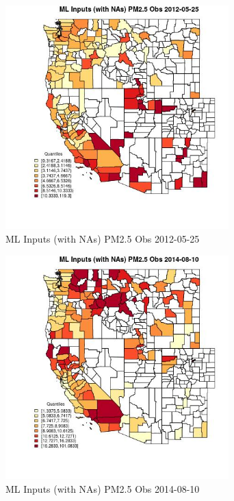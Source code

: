 
\clearpage 

\begin{figure} 
\centering  
\includegraphics[width=0.77\textwidth]{Code_Outputs/Report_ML_input_PM25_Step4_part_e_de_duplicated_aves_compiled_2019-05-18wNAs_CountyPM25_ObsMean2012-05-25_2012-05-25.jpg} 
\caption{\label{fig:Report_ML_input_PM25_Step4_part_e_de_duplicated_aves_compiled_2019-05-18wNAsCountyPM25_ObsMean2012-05-25_2012-05-25}ML Inputs (with NAs) PM2.5 Obs 2012-05-25} 
\end{figure} 
 

\begin{figure} 
\centering  
\includegraphics[width=0.77\textwidth]{Code_Outputs/Report_ML_input_PM25_Step4_part_e_de_duplicated_aves_compiled_2019-05-18wNAs_CountyPM25_ObsMean2014-08-10_2014-08-10.jpg} 
\caption{\label{fig:Report_ML_input_PM25_Step4_part_e_de_duplicated_aves_compiled_2019-05-18wNAsCountyPM25_ObsMean2014-08-10_2014-08-10}ML Inputs (with NAs) PM2.5 Obs 2014-08-10} 
\end{figure} 
 


